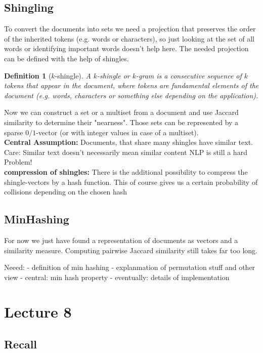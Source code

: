 \documentclass[]{article}
\newtheorem{defi}{Definition}
\begin{document}
\subsection{Shingling}
To convert the documents into sets we need a projection that preserves the order of the inherited tokens (e.g. words or characters), so just looking at the set of all words or identifying important words doesn't help here. The needed projection can be defined with the help of shingles.

\begin{defi}[$k$-shingle]
A $k$-shingle or $k$-gram is a consecutive sequence of $k$ tokens that appear in the document, where tokens are fundamental elements of the document (e.g. words, characters or something else depending on the application). 
\end{defi}
Now we can construct a set or a multiset from a document and use Jaccard similarity to determine their "nearness". Those sets can be represented by a sparse $0/1$-vector (or with integer values in case of a multiset). \\
\textbf{Central Assumption:} Documents, that share many shingles have similar text. Care: Similar text doesn't necessarily mean similar content NLP is still a hard Problem!\\

\textbf{compression of shingles:} There is the additional possibility to compress the shingle-vectors by a hash function. This of course gives us a certain probability of collisions depending on the chosen hash

\subsection{MinHashing}
For now we just have found a representation of documents as vectors and a similarity measure. Computing pairwise Jaccard similarity still takes far too long. 

Neeed:
 - definition of min hashing
 - explanmation of permutation stuff and other view
 - central: min hash property
 - eventually: details of implementation

\section{Lecture 8}

\subsection{Recall}
\end{document}
